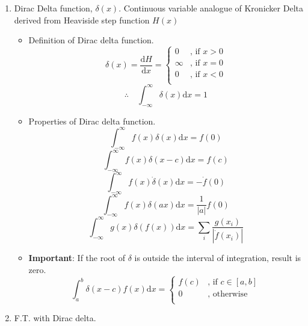 \documentclass{article}
\begin{document}
\begin{enumerate}
\begin{itemize}
\end{itemize}
\item Dirac Delta function, $\delta(x)$. Continuous variable analogue of Kronicker Delta derived from Heaviside step function $H(x)$
\begin{itemize}
\item Definition of Dirac delta function.
\begin{equation}
\delta(x)=\frac{\mathrm{d}H}{\mathrm{d}x}=
		\begin{cases}
			0 & \text{, if } x > 0\\
			\infty & \text{, if } x=0\\
			0&\text{, if } x<0\\
		\end{cases}
\end{equation}
\begin{equation}
\therefore \quad \int_{-\infty}^{\infty}\delta(x)\mathrm{d}x=1
\end{equation}
\item Properties of Dirac delta function.
\begin{equation}
\int_{-\infty}^{\infty}f(x)\delta(x)\mathrm{d}x = f(0)
\end{equation}
\begin{equation}
\int_{-\infty}^{\infty}f(x)\delta(x-c)\mathrm{d}x = f(c)
\end{equation}
\begin{equation}
\int_{-\infty}^{\infty}f(x)\dot{\delta}(x)\mathrm{d}x = -\dot{f}(0)
\end{equation}
\begin{equation}
\int_{-\infty}^{\infty}f(x)\delta(ax)\mathrm{d}x = \frac{1}{|a|}f(0)
\end{equation}
\begin{equation}
\int_{-\infty}^{\infty}g(x)\delta(f(x))\mathrm{d}x = \sum_i\frac{g(x_i)}{|\dot{f}(x_i)|}
\end{equation}
\item \textbf{Important}: If the root of $\delta$ is outside the interval of integration, result is zero.
\begin{equation}
\int_a^b\delta(x-c)f(x)\mathrm{d}x=
		\begin{cases}
			f(c) & \text{, if } c\in[a,b]\\
			0 & \text{, otherwise}\\
		\end{cases}
\end{equation}
\end{itemize}
\item F.T. with Dirac delta.

\end{enumerate}
\end{document}
